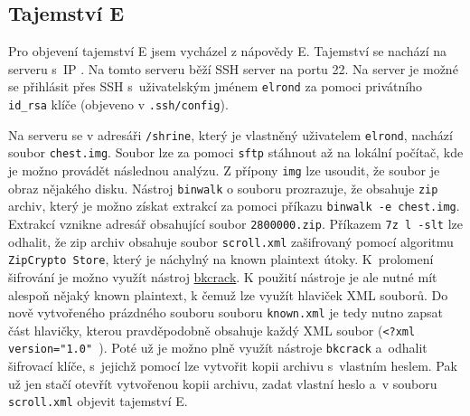 \documentclass[a4paper, 11pt]{article}
\begin{document}
\subsection{Tajemství E}
Pro objevení tajemství E jsem vycházel z nápovědy E. Tajemství se nachází na serveru  s~IP . Na tomto serveru běží SSH server na portu 22. Na server je možné se přihlásit přes SSH s~uživatelským jménem \texttt{elrond} za pomoci privátního \texttt{id\_rsa} klíče (objeveno v \texttt{.ssh/config}).

Na serveru se v adresáři \texttt{/shrine}, který je vlastněný uživatelem \texttt{elrond}, nachází soubor \texttt{chest.img}. Soubor lze za pomoci \texttt{sftp} stáhnout až na lokální počítač, kde je možno provádět následnou analýzu. Z přípony \texttt{img} lze usoudit, že soubor je obraz nějakého disku. Nástroj \texttt{binwalk} o souboru prozrazuje, že obsahuje \texttt{zip} archiv, který je možno získat extrakcí za pomoci příkazu \verb|binwalk -e chest.img|. Extrakcí vznikne adresář obsahující soubor \texttt{2800000.zip}. Příkazem \verb|7z l -slt| lze odhalit, že zip archiv obsahuje soubor \texttt{scroll.xml} zašifrovaný pomocí algoritmu \texttt{ZipCrypto Store}, který je náchylný na known plaintext útoky. K~prolomení šifrování je možno využít nástroj \href{https://github.com/kimci86/bkcrack}{bkcrack}. K použití nástroje je ale nutné mít alespoň nějaký known plaintext, k čemuž lze využít hlaviček XML souborů. Do nově vytvořeného prázdného souboru souboru \texttt{known.xml} je tedy nutno zapsat část hlavičky, kterou pravděpodobně obsahuje každý XML soubor (\verb|<?xml version="1.0" |). Poté už je možno plně využít nástroje \texttt{bkcrack} a~odhalit šifrovací klíče, s~jejichž pomocí lze vytvořit kopii archivu s~vlastním heslem. Pak už jen stačí otevřít vytvořenou kopii archivu, zadat vlastní heslo a~v souboru \texttt{scroll.xml} objevit tajemství E.   


\newpage
\end{document}
